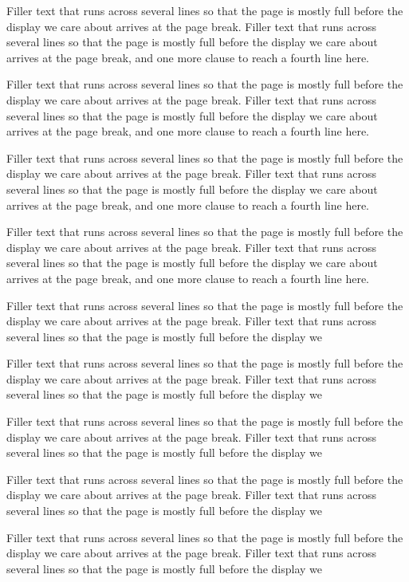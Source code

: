 \documentclass[10pt]{article}
\begin{document}
Filler text that runs across several lines so that the page is mostly full before the display we care about arrives at the page break. Filler text that runs across several lines so that the page is mostly full before the display we care about arrives at the page break, and one more clause to reach a fourth line here.

Filler text that runs across several lines so that the page is mostly full before the display we care about arrives at the page break. Filler text that runs across several lines so that the page is mostly full before the display we care about arrives at the page break, and one more clause to reach a fourth line here.

Filler text that runs across several lines so that the page is mostly full before the display we care about arrives at the page break. Filler text that runs across several lines so that the page is mostly full before the display we care about arrives at the page break, and one more clause to reach a fourth line here.

Filler text that runs across several lines so that the page is mostly full before the display we care about arrives at the page break. Filler text that runs across several lines so that the page is mostly full before the display we care about arrives at the page break, and one more clause to reach a fourth line here.

Filler text that runs across several lines so that the page is mostly full before the display we care about arrives at the page break. Filler text that runs across several lines so that the page is mostly full before the display we

Filler text that runs across several lines so that the page is mostly full before the display we care about arrives at the page break. Filler text that runs across several lines so that the page is mostly full before the display we

Filler text that runs across several lines so that the page is mostly full before the display we care about arrives at the page break. Filler text that runs across several lines so that the page is mostly full before the display we

Filler text that runs across several lines so that the page is mostly full before the display we care about arrives at the page break. Filler text that runs across several lines so that the page is mostly full before the display we

Filler text that runs across several lines so that the page is mostly full before the display we care about arrives at the page break. Filler text that runs across several lines so that the page is mostly full before the display we
\end{document}

